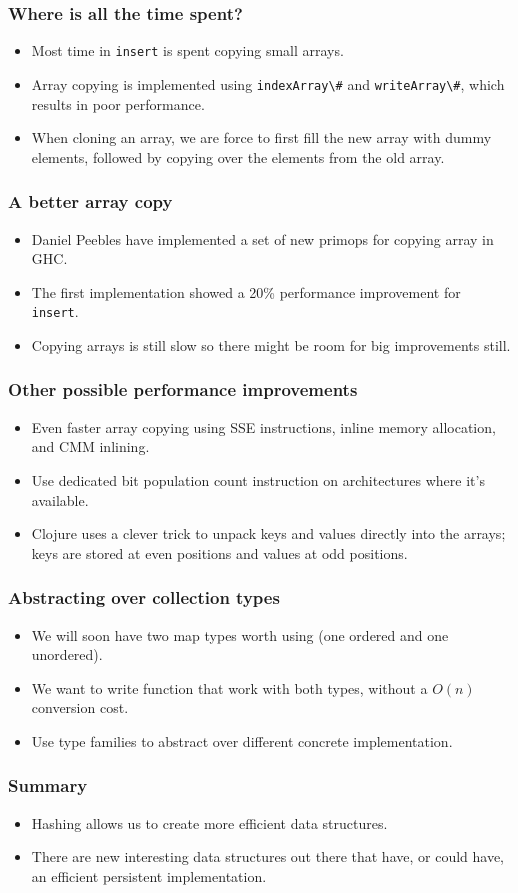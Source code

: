 \documentclass{beamer}
\begin{document}
\begin{frame}
  \frametitle{Where is all the time spent?}

  \begin{itemize}
  \item Most time in \lstinline!insert! is spent copying small arrays.
  \item Array copying is implemented using \lstinline!indexArray\#!
    and \lstinline!writeArray\#!, which results in poor performance.
  \item When cloning an array, we are force to first fill the new
    array with dummy elements, followed by copying over the elements
    from the old array.
  \end{itemize}
\end{frame}

\begin{frame}
  \frametitle{A better array copy}

  \begin{itemize}
  \item Daniel Peebles have implemented a set of new primops for
    copying array in GHC.
  \item The first implementation showed a 20\% performance improvement
    for \lstinline!insert!.
  \item Copying arrays is still slow so there might be room for big
    improvements still.
  \end{itemize}
\end{frame}

\begin{frame}
  \frametitle{Other possible performance improvements}
  \begin{itemize}
  \item Even faster array copying using SSE instructions, inline
    memory allocation, and CMM inlining.
  \item Use dedicated bit population count instruction on
    architectures where it's available.
  \item Clojure uses a clever trick to unpack keys and values directly
    into the arrays; keys are stored at even positions and values at
    odd positions.
  \end{itemize}
\end{frame}

\begin{frame}
  \frametitle{Abstracting over collection types}
  \begin{itemize}
  \item We will soon have two map types worth using (one ordered and one
    unordered).
  \item We want to write function that work with both types, without a
    $O(n)$ conversion cost.
  \item Use type families to abstract over different concrete
    implementation.
  \end{itemize}
\end{frame}

\begin{frame}
  \frametitle{Summary}
  \begin{itemize}
  \item Hashing allows us to create more efficient data structures.
  \item There are new interesting data structures out there that have,
    or could have, an efficient persistent implementation.
  \end{itemize}
\end{frame}
\end{document}
